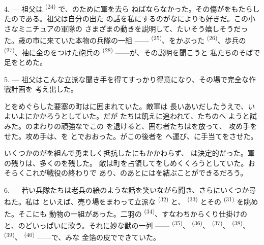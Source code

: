 \VUsaut{4.0mm}
\VUsaut{2.8mm}

4. --- 祖父は \textsuperscript{(24)} で、のために軍を去ら
ねばならなかった。その傷がをもたらしたのである。祖父は自分の出た
の話を私にするのがなによりも好きだ。この小さなミニチュアの軍隊の
さまざまの動きを説明して、たいそう嬉しそうだった。歳の市に来ていた本物の兵隊の一組
—— \textsuperscript{(25)}、をかぶった
\textsuperscript{(26)}、歩兵の \textsuperscript{(27)}、袖に金のをつけた砲兵の \textsuperscript{(28)} ——が、その説明を聞こうと
私たちのそばで足をとめた。

5. --- 祖父はこんな立派な聞き手を得てすっかり得意になり、その場で完全な作戦計画を
考え出した。

とをめぐらした要塞の町はに囲まれていた。敵軍は
長いあいだしたうえで、いよいよにかかろうとしていた。だが
たちは飢えに追われて、たちのへ
ようと試みた。のまわりの頑強なでこの
を退けると、囲む者たちはを放って、
攻め手をせた。攻め手は、を
とでおおった。がこの後者を
へ運び、に手当てをさせた。

いくつかのがを組んで勇ましく抵抗したにもかかわらず、
は決定的だった。軍の残りは、多くのを残した。
敵は町を占領してをしめくくろうとしていた。おそらくこれが戦役の終わりで
あり、のあとにはを結ぶことができるだろう。

\VUsaut{4.4mm}
\VUsaut{2.8mm}

6. --- 若い兵隊たちは老兵の絵のような話を笑いながら聞き、さらにいくつか尋ねた。私は
といえば、売り場をまわって立派な \textsuperscript{(32)} と、
\textsuperscript{(33)} とその \textsuperscript{(31)} を眺めた。そこにも
動物の一組があった。二羽の \textsuperscript{(34)}、すなわちからくり仕掛けの
と、のどいっぱいに歌う。それに妙な獣の一列
—— \textsuperscript{(35)}、 \textsuperscript{(36)}、
 \textsuperscript{(37)}、 \textsuperscript{(38)}、
 \textsuperscript{(39)}、 \textsuperscript{(40)} ——で、みな
金箔の皮でできていた。

